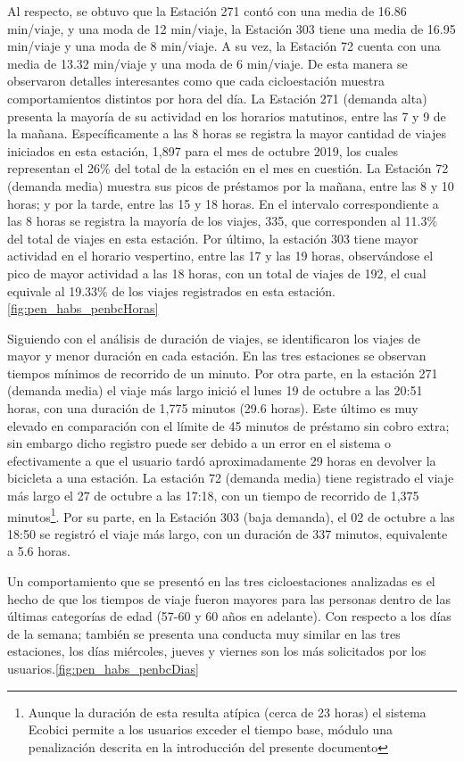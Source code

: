 \documentclass[9pt,twocolumn,twoside]{ilcss}
\begin{document}
Al respecto, se obtuvo que la Estación 271 contó con una media de 16.86 min/viaje, y una moda de 12 min/viaje, la Estación 303 tiene una media de 16.95 min/viaje y una moda de 8 min/viaje. A su vez, la Estación 72 cuenta con una media de 13.32 min/viaje y una moda de 6 min/viaje.  De esta manera se observaron detalles interesantes como que cada cicloestación muestra comportamientos distintos por hora del día. La Estación 271 (demanda alta) presenta la mayoría de su actividad en los horarios matutinos, entre las 7 y 9 de la mañana. Específicamente  a las 8 horas se registra la mayor cantidad de viajes iniciados en esta estación,  1,897 para el mes de octubre 2019, los cuales representan  el 26\% del total de la estación en el mes en cuestión. La Estación 72 (demanda media) muestra sus picos de préstamos por la mañana, entre las 8 y 10  horas; y por la tarde, entre las 15 y 18 horas. En el intervalo correspondiente a las 8 horas se registra la mayoría de los viajes, 335, que corresponden al 11.3\% del total de viajes en esta estación.  Por último, la estación 303 tiene mayor actividad en el horario vespertino, entre las 17 y las 19 horas, observándose el pico de mayor actividad a las 18 horas, con un total de viajes de 192, el cual equivale al 19.33\% de los viajes registrados en esta estación.\ref{fig:pen_habs_penbcHoras}

Siguiendo con el análisis de duración de viajes, se identificaron los viajes de mayor y menor duración en cada estación. En  las tres estaciones se observan tiempos mínimos de recorrido de un minuto. Por otra parte, en la estación 271 (demanda media) el viaje más largo inició el lunes 19 de octubre a las 20:51 horas, con una duración de 1,775 minutos (29.6 horas). Este último es muy elevado en comparación con el límite de 45 minutos de préstamo sin cobro extra; sin embargo dicho registro puede ser debido a un error en el sistema o efectivamente a que el usuario tardó aproximadamente 29 horas en devolver la bicicleta a una estación. La estación 72 (demanda media) tiene registrado el viaje más largo el 27 de octubre a las 17:18, con un tiempo de recorrido de 1,375 minutos\footnote{Aunque la duración de esta resulta atípica (cerca de 23 horas) el sistema Ecobici permite a los usuarios exceder el tiempo base, módulo una penalización descrita en la introducción del presente documento}. Por su parte, en la Estación 303 (baja demanda), el 02 de octubre a las 18:50 se registró el viaje más largo, con un duración de 337 minutos, equivalente a 5.6 horas.

Un comportamiento que se presentó en las tres cicloestaciones analizadas es el hecho de que los tiempos de viaje fueron mayores para las personas dentro de las últimas categorías de edad (57-60 y 60 años en adelante). Con respecto a los días de la semana; también se presenta una conducta muy similar en las tres estaciones, los días miércoles, jueves y viernes son los más solicitados por los usuarios.\ref{fig:pen_habs_penbcDias}    
\end{document}
